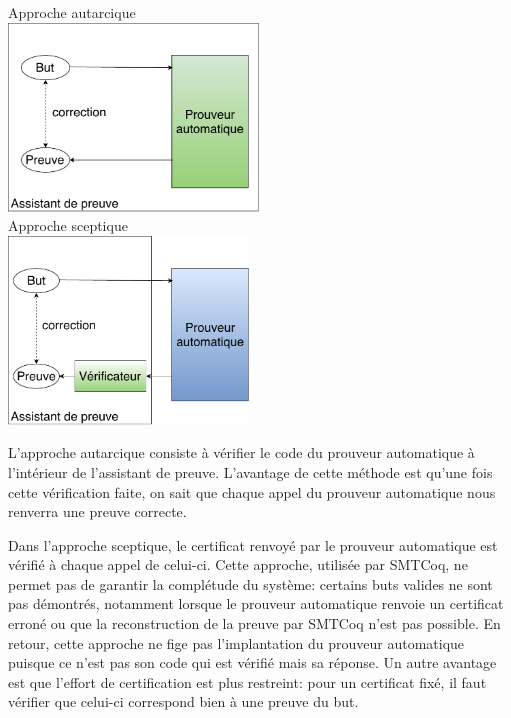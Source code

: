 \documentclass[11pt]{article}
\begin{document}
\begin{multicols}{2}
\begin{center}
Approche autarcique\\
\includegraphics[height=5cm]{1_Autarcique.pdf}\\
Approche sceptique\\
\includegraphics[height=5cm]{2_Sceptique.pdf}\\

\end{center}
\end{multicols}

L'approche autarcique consiste à vérifier le code du prouveur automatique à l'intérieur de l'assistant de preuve. L'avantage de cette méthode est qu'une fois cette vérification faite, on sait que chaque appel du prouveur automatique nous renverra une preuve correcte. \medbreak

Dans l'approche sceptique, le certificat renvoyé par le prouveur automatique est vérifié à chaque appel de celui-ci. Cette approche, utilisée par SMTCoq, ne permet pas de garantir la complétude du système: certains buts valides ne sont pas démontrés, notamment lorsque le prouveur automatique renvoie un certificat erroné ou que la reconstruction de la preuve par SMTCoq n'est pas possible. En retour, cette approche ne fige pas l'implantation du prouveur automatique puisque ce n'est pas son code qui est vérifié mais sa réponse. Un autre avantage est que l'effort de certification est plus restreint: pour un certificat fixé, il faut vérifier que celui-ci correspond bien à une preuve du but.
\end{document}
